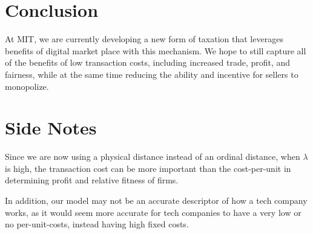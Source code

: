 \documentclass[final,5p,times,twocolumn,11pt]{elsarticle}
\numberwithin{equation}{section} %
\begin{document}
\section{Conclusion}

At MIT, we are currently developing a new form of taxation that leverages
benefits of digital market place with this mechanism. We hope to still capture
all of the benefits of low transaction costs, including increased trade,
profit, and  fairness, while at the same time reducing the ability and
incentive for sellers to monopolize.

\section{Side Notes}
Since we are now using a physical distance instead of an ordinal distance, when $\lambda$ is high, the transaction cost can be more important than the cost-per-unit in determining profit and relative fitness of firms.

In addition, our model may not be an accurate descriptor of how a tech company works, as it would seem more accurate for tech companies to have a very low or no per-unit-costs, instead having high fixed costs.
\end{document}
